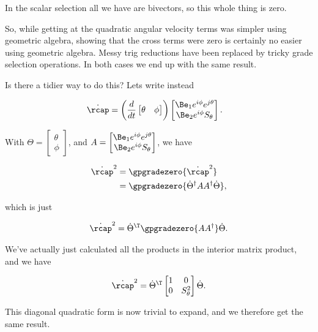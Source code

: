 In the scalar selection all we have are bivectors, so this whole thing is zero.

So, while getting at the quadratic angular velocity terms was simpler using geometric algebra, showing that the cross terms were zero is certainly no easier using geometric algebra.  Messy trig reductions have been replaced by tricky grade selection operations.  In both cases we end up with the same result.

Is there a tidier way to do this?  Lets write instead

\begin{align}\label{eqn:mp310}
\dot{\rcap}
&=
\left( \frac{d}{dt}
\begin{bmatrix}
\theta & \phi
\end{bmatrix} \right)
\begin{bmatrix}
\Be_1 e^{i \phi} e^{j \theta} \\
\Be_2 e^{i \phi} S_\theta
\end{bmatrix}.
\end{align}

With $\Theta = \begin{bmatrix}
\theta \\ \phi
\end{bmatrix}$, and $A =
\begin{bmatrix}
\Be_1 e^{i \phi} e^{j \theta} \\
\Be_2 e^{i \phi} S_\theta
\end{bmatrix}$, we have

\begin{align*}
\dot{\rcap}^2 
&= \gpgradezero{\dot{\rcap}^2} \\
&= \gpgradezero{\dot{\Theta}^\dagger A A^\dagger \dot{\Theta}},
\end{align*}

which is just

\begin{align}\label{eqn:mp320}
\dot{\rcap}^2 = \dot{\Theta}^\T \gpgradezero{ A A^\dagger } \dot{\Theta}.
\end{align}

We've actually just calculated all the products in the interior matrix product, and we have

\begin{align}\label{eqn:mp330}
\dot{\rcap}^2 = \dot{\Theta}^\T 
\begin{bmatrix}
1 & 0 \\
0 & S_\theta^2
\end{bmatrix}
\dot{\Theta}.
\end{align}

This diagonal quadratic form is now trivial to expand, and we therefore get the same result.

\EndArticle
